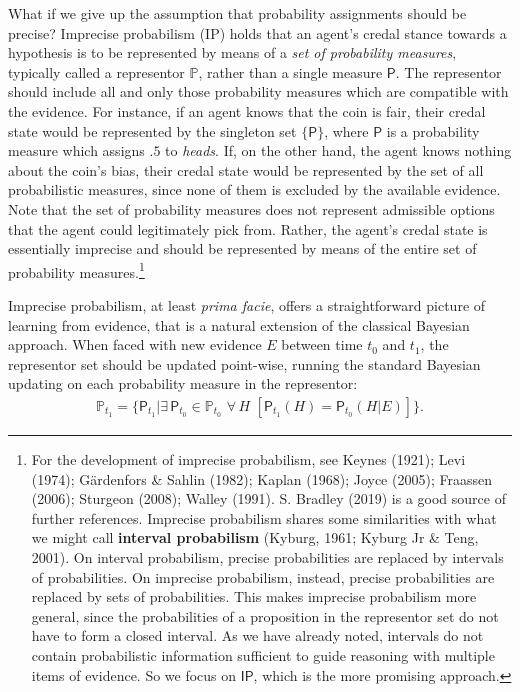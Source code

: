 \documentclass[
  10pt,
  dvipsnames,enabledeprecatedfontcommands]{scrartcl}
\newcommand{\s}[1]{\mbox{$\mathsf{#1}$}}
\begin{document}
What if we give up the assumption that probability assignments should be
precise? Imprecise probabilism (\textsf{IP}) holds that an agent's
credal stance towards a hypothesis is to be represented by means of a
\emph{set of probability measures}, typically called a representor
\(\mathbb{P}\), rather than a single measure \(\mathsf{P}\). The
representor should include all and only those probability measures which
are compatible with the evidence. For instance, if an agent knows that
the coin is fair, their credal state would be represented by the
singleton set \(\{\mathsf{P}\}\), where \(\mathsf{P}\) is a probability
measure which assigns \(.5\) to \emph{heads}. If, on the other hand, the
agent knows nothing about the coin's bias, their credal state would be
represented by the set of all probabilistic measures, since none of them
is excluded by the available evidence. Note that the set of probability
measures does not represent admissible options that the agent could
legitimately pick from. Rather, the agent's credal state is essentially
imprecise and should be represented by means of the entire set of
probability measures.\footnote{For the development of imprecise
  probabilism, see Keynes (1921); Levi (1974); Gärdenfors \& Sahlin
  (1982); Kaplan (1968); Joyce (2005); Fraassen (2006); Sturgeon (2008);
  Walley (1991). S. Bradley (2019) is a good source of further
  references. Imprecise probabilism shares some similarities with what
  we might call \textbf{interval probabilism} (Kyburg, 1961; Kyburg Jr
  \& Teng, 2001). On interval probabilism, precise probabilities are
  replaced by intervals of probabilities. On imprecise probabilism,
  instead, precise probabilities are replaced by sets of probabilities.
  This makes imprecise probabilism more general, since the probabilities
  of a proposition in the representor set do not have to form a closed
  interval. As we have already noted, intervals do not contain
  probabilistic information sufficient to guide reasoning with multiple
  items of evidence. So we focus on \s{IP}, which is the more promising
  approach.}

Imprecise probabilism, at least \emph{prima facie}, offers a
straightforward picture of learning from evidence, that is a natural
extension of the classical Bayesian approach. When faced with new
evidence \(E\) between time \(t_0\) and \(t_1\), the representor set
should be updated point-wise, running the standard Bayesian updating on
each probability measure in the representor:
\begin{align*} \label{eq:updateRepresentor}
\mathbb{P}_{t_1} = \{\mathsf{P}_{t_1}\vert \exists\, {\mathsf{P}_{t_0} \!\in  \mathbb{P}_{t_0}}\,\, \forall\, {H}\,\, \left[\mathsf{P}_{t_1}(H)=\mathsf{P}_{t_0}(H \vert E)\right] \}.
\end{align*}
\end{document}

